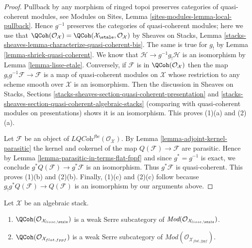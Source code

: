 \begin{proof}
Pullback by any morphism of ringed topoi preserves categories of quasi-coherent
modules, see
Modules on Sites, Lemma \ref{sites-modules-lemma-local-pullback}.
Hence $g^{-1}$ preserves the categories of quasi-coherent modules;
here we use that
$\QCoh(\mathcal{O}_\mathcal{X}) =
\QCoh(\mathcal{X}_\etale, \mathcal{O}_\mathcal{X})$
by Sheaves on Stacks, Lemma
\ref{stacks-sheaves-lemma-characterize-quasi-coherent-bis}.
The same is true for $g_!$ by
Lemma \ref{lemma-shriek-quasi-coherent}.
We know that $\mathcal{H} \to g^{-1}g_!\mathcal{H}$ is an isomorphism by
Lemma \ref{lemma-lisse-etale}.
Conversely, if $\mathcal{F}$ is in $\QCoh(\mathcal{O}_\mathcal{X})$
then the map $g_!g^{-1}\mathcal{F} \to \mathcal{F}$ is a map of quasi-coherent
modules on $\mathcal{X}$ whose restriction to any scheme smooth over
$\mathcal{X}$ is an isomorphism. Then the discussion in
Sheaves on Stacks, Sections
\ref{stacks-sheaves-section-quasi-coherent-presentation} and
\ref{stacks-sheaves-section-quasi-coherent-algebraic-stacks}
(comparing with quasi-coherent modules on presentations)
shows it is an isomorphism. This proves (1)(a) and (2)(a).

\medskip\noindent
Let $\mathcal{F}$ be an object of
$\textit{LQCoh}^{fbc}(\mathcal{O}_\mathcal{X})$. By
Lemma \ref{lemma-adjoint-kernel-parasitic}
the kernel and cokernel of the map
$Q(\mathcal{F}) \to \mathcal{F}$ are parasitic. Hence by
Lemma \ref{lemma-parasitic-in-terms-flat-fppf}
and since $g^* = g^{-1}$ is exact, we conclude
$g^*Q(\mathcal{F}) \to g^*\mathcal{F}$ is an isomorphism. Thus
$g^*\mathcal{F}$ is quasi-coherent. This proves (1)(b) and (2)(b).
Finally, (1)(c) and (2)(c) follow because
$g_!g^*Q(\mathcal{F}) \to Q(\mathcal{F})$ is an isomorphism by
our arguments above.
\end{proof}

\begin{lemma}
\label{lemma-quasi-coherent-weak-serre}
Let $\mathcal{X}$ be an algebraic stack.
\begin{enumerate}
\item $\QCoh(\mathcal{O}_{\mathcal{X}_{lisse,\etale}})$
is a weak Serre subcategory of
$\textit{Mod}(\mathcal{O}_{\mathcal{X}_{lisse,\etale}})$.
\item $\QCoh(\mathcal{O}_{\mathcal{X}_{flat,fppf}})$
is a weak Serre subcategory of
$\textit{Mod}(\mathcal{O}_{\mathcal{X}_{flat,fppf}})$.
\end{enumerate}
\end{lemma}

